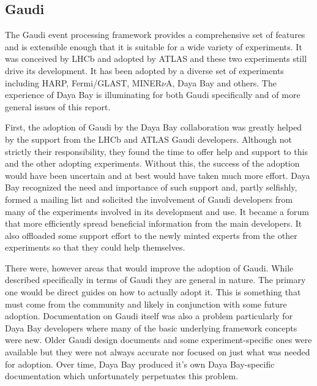 
\subsection{Gaudi}

The Gaudi event processing framework\cite{gaudi_lhcb,gaudi_atlas} provides a comprehensive set of
features and is extensible enough that it is suitable for a wide
variety of experiments.  It was conceived by LHCb and adopted by ATLAS
and these two experiments still drive its development.  It has been
adopted by a diverse set of experiments including HARP, Fermi/GLAST,
MINER$\nu$A, Daya Bay and others.  The experience of Daya Bay is
illuminating for both Gaudi specifically and of more general issues of
this report.

First, the adoption of Gaudi by the Daya Bay collaboration 
was greatly helped by the support from the LHCb
and ATLAS Gaudi developers.  Although not strictly their
responsibility, they found the time to offer help and support to this and the other
adopting experiments.  Without this, the success of the adoption would have been uncertain
and at best would have taken much more effort.  Daya Bay recognized
the need and importance of such support and, partly selfishly, formed
a mailing list\cite{gauditalk} and solicited the involvement of Gaudi developers from many
of the experiments involved in its development and use.  It became a forum that more efficiently spread
beneficial information from the main developers.  It also offloaded
some support effort to the newly minted experts from the other experiments so that they could help
themselves.

There were, however areas that would improve the adoption of Gaudi.
While described specifically in terms of Gaudi they are general in nature.
The primary one would be direct guides on how to actually adopt it.
This is something that must come from the community and likely in
conjunction with some future adoption.  Documentation on Gaudi itself
was also a problem particularly for Daya Bay developers where many of the basic
underlying framework concepts were new.  Older Gaudi design documents and
some experiment-specific ones were available but they were not always accurate
nor focused on just what was needed for adoption.  Over time, Daya Bay produced it's own
Daya Bay-specific documentation which unfortunately perpetuates this
problem.

